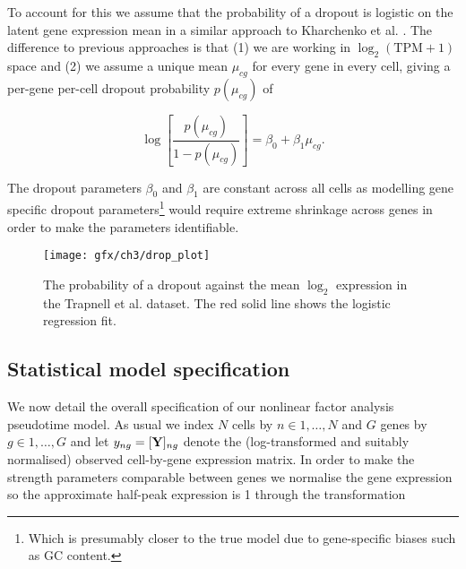 To account for this we assume that the probability of a dropout is logistic on the latent gene expression mean in a similar approach to Kharchenko et al. \cite{Kharchenko2014}. The difference to previous approaches is that (1) we are working in $\log_2(\text{TPM} + 1)$ space and (2) we assume a unique mean $\mu_{cg}$ for every gene in every cell, giving a per-gene per-cell dropout probability $p(\mu_{cg})$ of

\begin{equation}
\log\left[ \frac{p(\mu_{cg})}{1 - p(\mu_{cg})} \right] = \beta_0 + \beta_1 \mu_{cg}.
\end{equation}

The dropout parameters $\beta_0$ and $\beta_1$ are constant across all cells as modelling gene specific dropout parameters\footnote{Which is presumably closer to the true model due to gene-specific biases such as GC content.} would require extreme shrinkage across genes in order to make the parameters identifiable.


\begin{figure}
\centering
 \texttt{[image: gfx/ch3/drop\_plot]}
 \caption[Dropout probability as a function of mean expression.]{The probability of a dropout against the mean $\log_2$ expression in the Trapnell et al. dataset. The red solid line shows the logistic regression fit.} \label{fig:dropout}
 \end{figure}

\subsection{Statistical model specification}


We now detail the overall specification of our nonlinear factor analysis pseudotime model. As usual we index $N$ cells by $n \in 1, \ldots, N$ and $G$ genes by $g \in 1, \ldots, G$ and let $y_{ng} = [{\bf Y}]_{ng}$ denote the (log-transformed and suitably normalised) observed cell-by-gene expression matrix. In order to make the strength parameters comparable between genes we normalise the gene expression so the approximate half-peak expression is 1 through the transformation

